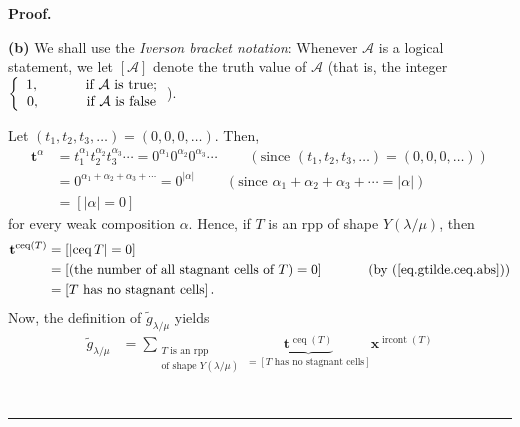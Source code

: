 \documentclass[numbers=enddot,12pt,final,onecolumn,notitlepage]{scrartcl}%
\theoremstyle{definition}
\newenvironment{proof}[1][Proof]{\noindent\textbf{#1.} }{\ \rule{0.5em}{0.5em}}
\newenvironment{verlong}{}{}
\newenvironment{vershort}{}{}
\let\sumnonlimits\sum
\renewcommand{\sum}{\sumnonlimits\limits}
\begin{document}
\begin{proof}
\begin{vershort}
\end{vershort}

\begin{verlong}
\textbf{(b)} We shall use the \textit{Iverson bracket notation}: Whenever
$\mathcal{A}$ is a logical statement, we let $\left[  \mathcal{A}\right]  $
denote the truth value of $\mathcal{A}$ (that is, the integer $\left\{
\begin{array}
[c]{c}%
1,\ \ \ \ \ \ \ \ \ \ \text{if }\mathcal{A}\text{ is true;}\\
0,\ \ \ \ \ \ \ \ \ \ \text{if }\mathcal{A}\text{ is false}%
\end{array}
\right.  $).

Let $\left(  t_{1},t_{2},t_{3},\ldots\right)  =\left(  0,0,0,\ldots\right)  $.
Then,
\begin{align*}
\mathbf{t}^{\alpha}  &  =t_{1}^{\alpha_{1}}t_{2}^{\alpha_{2}}t_{3}^{\alpha
_{3}}\cdots=0^{\alpha_{1}}0^{\alpha_{2}}0^{\alpha_{3}}\cdots
\ \ \ \ \ \ \ \ \ \ \left(  \text{since }\left(  t_{1},t_{2},t_{3}%
,\ldots\right)  =\left(  0,0,0,\ldots\right)  \right) \\
&  =0^{\alpha_{1}+\alpha_{2}+\alpha_{3}+\cdots}=0^{\left\vert \alpha
\right\vert }\ \ \ \ \ \ \ \ \ \ \left(  \text{since }\alpha_{1}+\alpha
_{2}+\alpha_{3}+\cdots=\left\vert \alpha\right\vert \right) \\
&  =\left[  \left\vert \alpha\right\vert =0\right]
\end{align*}
for every weak composition $\alpha$. Hence, if $T$ is an rpp of shape
$Y\left(  \lambda/\mu\right)  $, then%
\begin{align*}
\mathbf{t}^{\operatorname*{ceq}\left(  T\right)  }  &  =\left[  \left\vert
\operatorname*{ceq}T\right\vert =0\right] \\
&  =\left[  \left(  \text{the number of all stagnant cells of }T\right)
=0\right]  \ \ \ \ \ \ \ \ \ \ \left(  \text{by (\ref{eq.gtilde.ceq.abs}%
)}\right) \\
&  =\left[  T\text{ has no stagnant cells}\right]  .
\end{align*}
Now, the definition of $\widetilde{g}_{\lambda/\mu}$ yields%
\begin{align*}
\widetilde{g}_{\lambda/\mu}  &  =\sum_{\substack{T\text{ is an rpp}\\\text{of
shape }Y\left(  \lambda/\mu\right)  }}\underbrace{\mathbf{t}%
^{\operatorname*{ceq}\left(  T\right)  }}_{=\left[  T\text{ has no stagnant
cells}\right]  }\mathbf{x}^{\operatorname*{ircont}\left(  T\right)  }\\

\end{align*}
\end{verlong}
\end{proof}
\end{document}
